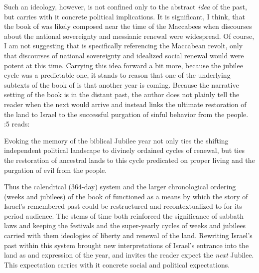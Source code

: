 Such an ideology, however, is not confined only to the abstract \emph{idea} of the past, but carries with it concrete political implications. It is significant, I think, that the book of \jub was likely composed near the time of the Maccabees when discourses about the national sovereignty and messianic renewal were widespread. Of course, I am not suggesting that \jub is specifically referencing the Maccabean revolt, only that discourses of national sovereignty and idealized social renewal would were potent at this time. Carrying this idea forward a bit more, because the jubilee cycle was a predictable one, it stands to reason that one of the underlying subtexts of the book of \jub is that another \jub year is coming. Because the narrative setting of the book is in the distant past, the author does not plainly tell the reader when the next \jub would arrive and instead links the ultimate restoration of the land to Israel to the successful purgation of sinful behavior from the people. :5 reads:


\noindent
Evoking the memory of the biblical Jubilee year not only ties the shifting independent political landscape to divinely ordained cycles of renewal, but ties the restoration of ancestral lands to this cycle predicated on proper living and the purgation of evil from the people. 

Thus the calendrical (364-day) system and the larger chronological ordering (weeks and jubilees) of the book of \jub functioned as a means by which the story of Israel's remembered past could be restructured and recontextualized to for its \secondtemple period audience. The stems of time both reinforced the significance of sabbath laws and keeping the festivals and the super-yearly cycles of weeks and jubilees carried with them ideologies of liberty and renewal of the land. Rewriting Israel's past within this system brought new interpretations of Israel's entrance into the land as and expression of the \jub year, and invites the reader expect the \emph{next} Jubilee. This expectation carries with it concrete social and political expectations.
